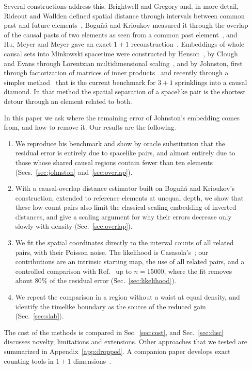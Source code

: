 \documentclass[prd,twocolumn,superscriptaddress,nofootinbib,amsmath,amssymb,floatfix]{revtex4-2}
\begin{document}
Several constructions address this. Brightwell and Gregory and, in more detail, Rideout and Wallden defined spatial distance through intervals between common past and future elements~\cite{BrightwellGregory91,RideoutWallden09}. Bogu\~n\'a and Krioukov measured it through the overlap of the causal pasts of two elements as seen from a common past element~\cite{BK24}, and Hu, Meyer and Meyer gave an exact $1+1$ reconstruction~\cite{HMM25}. Embeddings of whole causal sets into Minkowski spacetime were constructed by Henson~\cite{Henson06}, by Clough and Evans through Lorentzian multidimensional scaling~\cite{CloughEvans16}, and by Johnston, first through factorization of matrices of inner products~\cite{Johnston22} and recently through a simpler method~\cite{Johnston25} that is the current benchmark for $3+1$ sprinklings into a causal diamond. In that method the spatial separation of a spacelike pair is the shortest detour through an element related to both.

In this paper we ask where the remaining error of Johnston's embedding comes from, and how to remove it. Our results are the following.
\begin{enumerate}
\item We reproduce his benchmark and show by oracle substitution that the residual error is entirely due to spacelike pairs, and almost entirely due to those whose shared causal regions contain fewer than ten elements (Secs.~\ref{sec:johnston} and~\ref{sec:overlap}).
\item With a causal-overlap distance estimator built on Bogu\~n\'a and Krioukov's construction, extended to reference elements at unequal depth, we show that these low-count pairs also limit the classical-scaling embedding of inverted distances, and give a scaling argument for why their errors decrease only slowly with density (Sec.~\ref{sec:overlap}).
\item We fit the spatial coordinates directly to the interval counts of all related pairs, with their Poisson noise. The likelihood is Casasola's~\cite{Casasola26}; our contributions are an intrinsic starting map, the use of all related pairs, and a controlled comparison with Ref.~\cite{Johnston25} up to $n=15000$, where the fit removes about $80\%$ of the residual error (Sec.~\ref{sec:likelihood}).
\item We repeat the comparison in a region without a waist at equal density, and identify the timelike boundary as the source of the reduced gain (Sec.~\ref{sec:slab}).
\end{enumerate}
The cost of the methods is compared in Sec.~\ref{sec:cost}, and Sec.~\ref{sec:disc} discusses novelty, limitations and extensions. Other approaches that we tested are summarized in Appendix~\ref{app:dropped}. A companion paper develops exact counting tools in $1+1$ dimensions~\cite{Toolkit}.
\end{document}
